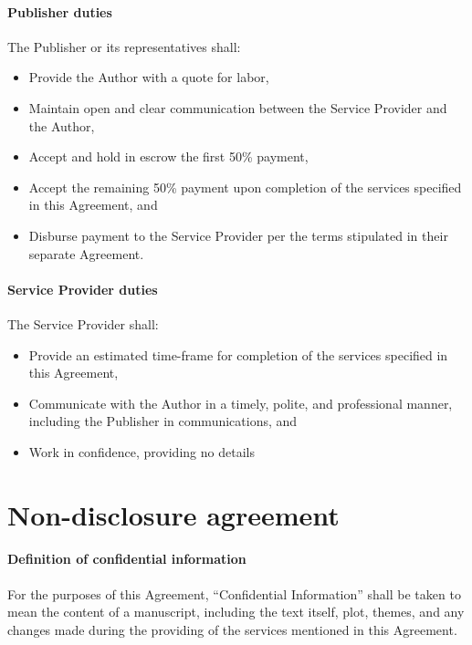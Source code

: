 \documentclass[12pt,letterpaper,oneside]{article}
\begin{document}
\paragraph{Publisher duties}

The Publisher or its representatives shall:

\begin{itemize}
    \item Provide the Author with a quote for labor,
    \item Maintain open and clear communication between the Service Provider and the Author,
    \item Accept and hold in escrow the first 50\% payment,
    \item Accept the remaining 50\% payment upon completion of the services specified in this Agreement, and
    \item Disburse payment to the Service Provider per the terms stipulated in their separate Agreement.
\end{itemize}

\paragraph{Service Provider duties}

The Service Provider shall:

\begin{itemize}
  \item Provide an estimated time-frame for completion of the services specified in this Agreement,
  \item Communicate with the Author in a timely, polite, and professional manner, including the Publisher in communications, and
  \item Work in confidence, providing no details
\end{itemize}

\section{Non-disclosure agreement}

\paragraph{Definition of confidential information}

For the purposes of this Agreement, ``Confidential Information'' shall be taken to mean the content of a manuscript, including the text itself, plot, themes, and any changes made during the providing of the services mentioned in this Agreement.
\end{document}
